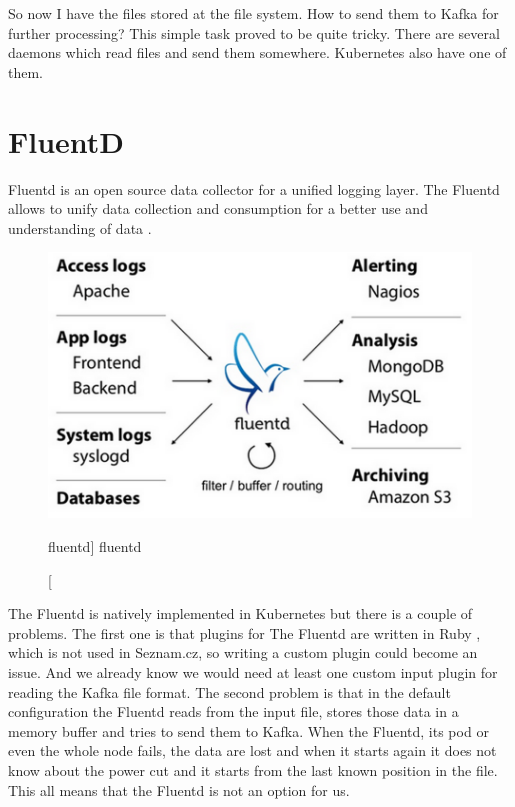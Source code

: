 So now I have the files stored at the file system. How to send them to Kafka for further processing? This simple task proved to be quite tricky. There are several daemons which read files and send them somewhere. Kubernetes also have one of them.

\section{FluentD}

Fluentd is an open source data collector for a unified logging layer. The Fluentd allows to unify data collection and consumption for a better use and understanding of data \cite{fluentd}.

\begin{figure}[htb]\centering
  \includegraphics[width=1\textwidth]{images/fluentd-architecture.png}
  \caption
    [fluentd]
    {fluentd \cite{fluentd}}
  \label{fig:fluentd}
\end{figure}
 
The Fluentd is natively implemented in Kubernetes but there is a couple of problems. The first one is that plugins for The Fluentd are written in Ruby \cite{ruby}, which is not used in Seznam.cz, so writing a custom plugin could become an issue. And we already know we would need at least one custom input plugin for reading the Kafka file format. The second problem is that in the default configuration the Fluentd reads from the input file, stores those data in a memory buffer and tries to send them to Kafka. When the Fluentd, its pod or even the whole node fails, the data are lost and when it starts again it does not know about the power cut and it starts from the last known position in the file. This all means that the Fluentd is not an option for us.

